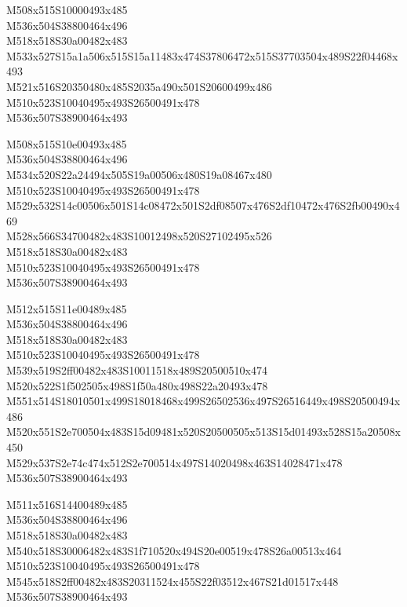 \documentclass{article}
\begin{document}
\begin{multicols}{5}
\begin{center}

M508x515S10000493x485 %
\\M536x504S38800464x496 %
\\M518x518S30a00482x483 %
\\M533x527S15a1a506x515S15a11483x474S37806472x515S37703504x489S22f04468x493 %
\\M521x516S20350480x485S2035a490x501S20600499x486 %
\\M510x523S10040495x493S26500491x478 %
\\M536x507S38900464x493 %
\vfil
\columnbreak

M508x515S10e00493x485 %
\\M536x504S38800464x496 %
\\M534x520S22a24494x505S19a00506x480S19a08467x480 %
\\M510x523S10040495x493S26500491x478 %
\\M529x532S14c00506x501S14c08472x501S2df08507x476S2df10472x476S2fb00490x469 %
\\M528x566S34700482x483S10012498x520S27102495x526 %
\\M518x518S30a00482x483 %
\\M510x523S10040495x493S26500491x478 %
\\M536x507S38900464x493 %
\vfil
\columnbreak

M512x515S11e00489x485 %
\\M536x504S38800464x496 %
\\M518x518S30a00482x483 %
\\M510x523S10040495x493S26500491x478 %
\\M539x519S2ff00482x483S10011518x489S20500510x474 %
\\M520x522S1f502505x498S1f50a480x498S22a20493x478 %
\\M551x514S18010501x499S18018468x499S26502536x497S26516449x498S20500494x486 %
\\M520x551S2e700504x483S15d09481x520S20500505x513S15d01493x528S15a20508x450 %
\\M529x537S2e74c474x512S2e700514x497S14020498x463S14028471x478 %
\\M536x507S38900464x493 %
\vfil
\columnbreak

M511x516S14400489x485 %
\\M536x504S38800464x496 %
\\M518x518S30a00482x483 %
\\M540x518S30006482x483S1f710520x494S20e00519x478S26a00513x464 %
\\M510x523S10040495x493S26500491x478 %
\\M545x518S2ff00482x483S20311524x455S22f03512x467S21d01517x448 %
\\M536x507S38900464x493 %
\vfil
\columnbreak


\end{center}
\end{multicols}
\end{document}
